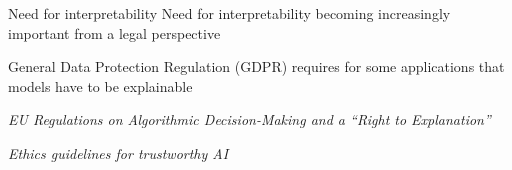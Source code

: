 \documentclass[10pt,compress,t,notes=noshow, xcolor=table]{beamer}
\begin{document}
\begin{framev}[align=top]{Need for interpretability}
Need for interpretability becoming increasingly important from a legal perspective
\begin{itemizeM}
\item General Data Protection Regulation (GDPR) requires for some applications that models have to be explainable
\\
\item[$\leadsto$] \textit{EU Regulations on Algorithmic Decision-Making and a ``Right to Explanation''}
\item \textit{Ethics guidelines for trustworthy AI}
\end{itemizeM}
\end{framev}


\end{document}
